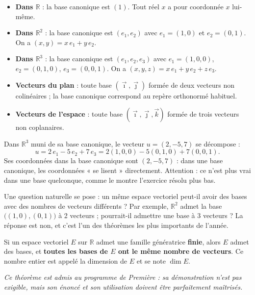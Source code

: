 \documentclass[11pt]{article}
\newcommand{\cle}[1]{{\popxbold\color{popdark}#1}}
\newcounter{popsec}
\newcounter{popsub}
\newcommand{\courssub}[1]{%
  \stepcounter{popsub}%
  \par\vspace{9pt}\noindent{\popxbold\fontsize{11.5}{13}\selectfont\color{popink}{\color{poporange}\thepopsec.\thepopsub}\hspace{6pt}#1}\par\nopagebreak\vspace{4pt}
}
\begin{document}
\begin{aretenir}
\begin{itemize}
\item \textbf{Dans $\mathbb{R}$} : la base canonique est $(1)$. Tout réel $x$ a pour coordonnée $x$ lui-même.
\item \textbf{Dans $\mathbb{R}^2$} : la base canonique est $(e_1, e_2)$ avec $e_1 = (1,0)$ et $e_2 = (0,1)$. On a $(x,y) = x\,e_1 + y\,e_2$.
\item \textbf{Dans $\mathbb{R}^3$} : la base canonique est $(e_1, e_2, e_3)$ avec $e_1 = (1,0,0)$, $e_2 = (0,1,0)$, $e_3 = (0,0,1)$. On a $(x,y,z) = x\,e_1 + y\,e_2 + z\,e_3$.
\item \textbf{Vecteurs du plan} : toute base $(\vec{\imath}, \vec{\jmath})$ formée de deux vecteurs non colinéaires ; la base canonique correspond au repère orthonormé habituel.
\item \textbf{Vecteurs de l'espace} : toute base $(\vec{\imath}, \vec{\jmath}, \vec{k})$ formée de trois vecteurs non coplanaires.
\end{itemize}
\end{aretenir}

\begin{exemplebox}
Dans $\mathbb{R}^3$ muni de sa base canonique, le vecteur $u = (2, -5, 7)$ se décompose :
\[ u = 2\,e_1 - 5\,e_2 + 7\,e_3 = 2(1,0,0) - 5(0,1,0) + 7(0,0,1). \]
Ses coordonnées dans la base canonique sont $(2, -5, 7)$ : dans une base canonique, les coordonnées « se lisent » directement. Attention : ce n'est plus vrai dans une base quelconque, comme le montre l'exercice résolu plus bas.
\end{exemplebox}

\courssub{Théorème de la dimension}

Une question naturelle se pose : un même espace vectoriel peut-il avoir des bases avec des nombres de vecteurs différents ? Par exemple, $\mathbb{R}^2$ admet la base $\big((1,0),(0,1)\big)$ à 2 vecteurs ; pourrait-il admettre une base à 3 vecteurs ? La réponse est non, et c'est l'un des théorèmes les plus importants de l'année.

\begin{propriete}
Si un espace vectoriel $E$ sur $\mathbb{R}$ admet une famille génératrice \textbf{finie}, alors $E$ admet des bases, et \textbf{toutes les bases de $E$ ont le même nombre de vecteurs}. Ce nombre entier est appelé la \cle{dimension} de $E$ et se note $\dim E$.

\emph{Ce théorème est admis au programme de Première : sa démonstration n'est pas exigible, mais son énoncé et son utilisation doivent être parfaitement maîtrisés.}
\end{propriete}
\end{document}
